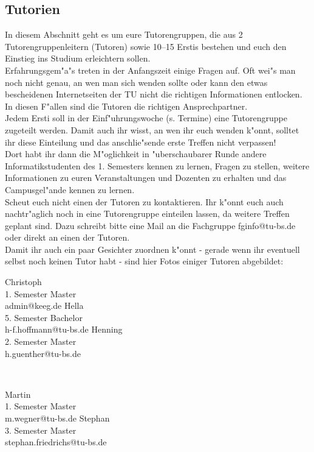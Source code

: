 \subsection{Tutorien}

In diesem Abschnitt geht es um eure Tutorengruppen, die aus 2 Tutorengruppenleitern (Tutoren) sowie 10--15 Erstis bestehen und euch den Einstieg ins Studium erleichtern sollen.\\
Erfahrungsgem"a"s treten in der Anfangszeit einige Fragen auf. Oft wei"s man noch nicht genau, an wen man sich wenden sollte oder kann den etwas bescheidenen Internetseiten der TU nicht die richtigen Informationen entlocken. In diesen F"allen sind die Tutoren die richtigen Ansprechpartner.\\
Jedem Ersti soll in der Einf"uhrungswoche (s. Termine) eine Tutorengruppe zugeteilt werden. Damit auch ihr wisst, an wen ihr euch wenden k"onnt, solltet ihr diese Einteilung und das anschlie"sende erste Treffen nicht verpassen!\\
Dort habt ihr dann die M"oglichkeit in "uberschaubarer Runde andere Informatikstudenten des 1. Semesters kennen zu lernen, Fragen zu stellen, weitere Informationen zu euren Veranstaltungen und Dozenten zu erhalten und das Campusgel"ande kennen zu lernen.\\
Scheut euch nicht einen der Tutoren zu kontaktieren. Ihr k"onnt euch auch nachtr"aglich noch in eine Tutorengruppe einteilen lassen, da weitere Treffen geplant sind. Dazu schreibt bitte eine Mail an die Fachgruppe fginfo@tu-bs.de oder direkt an einen der Tutoren.\\
Damit ihr auch ein paar Gesichter zuordnen k"onnt - gerade wenn ihr eventuell selbst noch keinen Tutor habt - sind hier Fotos einiger Tutoren abgebildet:

\onecolumn

{Christoph\\ 1. Semester Master\\ admin@keeg.de}
\hfill
{}
{Hella\\ 5. Semester Bachelor\\ h-f.hoffmann@tu-bs.de}
\hfill
{}
{Henning\\ 2. Semester Master\\ h.guenther@tu-bs.de}
\par \ \par
{}
{Martin\\ 1. Semester Master\\ m.wegner@tu-bs.de}
\hfill
{}
{Stephan\\ 3. Semester Master\\ stephan.friedrichs@tu-bs.de}

